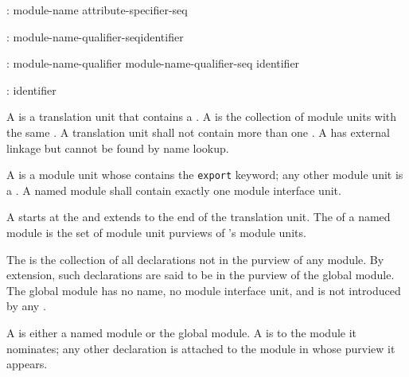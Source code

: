\begin{std.txt}\color{addclr}
  \begin{bnf}\color{addclr}
    :\br
       \opt {}  module-name attribute-specifier-seq\opt \terminal{;}
  \end{bnf}
  
  \begin{bnf}\color{addclr}
    :\br
      module-name-qualifier-seq\opt identifier
  \end{bnf}
  
  \begin{bnf}\color{addclr}
    :\br
      module-name-qualifier  \br
      module-name-qualifier-seq identifier 
  \end{bnf}
  
  \begin{bnf}\color{addclr}
    :\br
      identifier
  \end{bnf}
  
  \resetalinea[0]
\alinea A  is a translation unit that contains
a . A  is the
collection of module units with the same .
A translation unit shall not contain more than
one . A 
has external linkage but cannot be found by name lookup.

\alinea
A  is a module unit whose
 contains the \texttt{export} keyword;
any other module unit is a .  A named
module shall contain exactly one module interface unit.

\alinea
A  starts at the 
and extends to the end of the translation unit.
The  of a named module  is the set of module unit purviews
of 's module units. 

\alinea
The  is the collection of all declarations
not in the purview of any module.   By
extension, such declarations  are said to be in the purview of the
global module. 
\enternote
The global module has no name, no module interface unit, and is not
  introduced by any 
  .
\exitnote

\alinea
  A  is either a named module or the global module.
  A  is
   to the module it nominates; any other declaration
  is attached to the module in whose purview it appears.


\end{std.txt}
